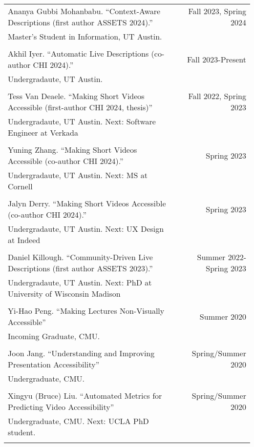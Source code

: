\begin{longtable}{Xr}
	Ananya Gubbi Mohanbabu. ``Context-Aware Descriptions (first author ASSETS 2024).'' & Fall 2023, Spring 2024 \\
	Master's Student in Information, UT Austin. &  \\
	\\

	Akhil Iyer. ``Automatic Live Descriptions (co-author CHI 2024).'' & Fall 2023-Present \\
	Undergradaute, UT Austin. &  \\
	\\

	Tess Van Deaele. ``Making Short Videos Accessible (first-author CHI 2024, thesis)'' & Fall 2022, Spring 2023 \\
	Undergradaute, UT Austin. Next: Software Engineer at Verkada &  \\
	\\

	Yuning Zhang. ``Making Short Videos Accessible (co-author CHI 2024).'' & Spring 2023 \\
	Undergradaute, UT Austin. Next: MS at Cornell &  \\
	\\

	Jalyn Derry. ``Making Short Videos Accessible (co-author CHI 2024).'' & Spring 2023 \\
	Undergradaute, UT Austin. Next: UX Design at Indeed &  \\
	\\

	Daniel Killough. ``Community-Driven Live Descriptions (first author ASSETS 2023).'' & Summer 2022-Spring 2023 \\
	Undergradaute, UT Austin. Next: PhD at University of Wisconsin Madison &  \\
	\\

	Yi-Hao Peng. ``Making Lectures Non-Visually Accessible'' & Summer 2020 \\
	Incoming Graduate, CMU. &  \\
	\\

	Joon Jang. ``Understanding and Improving Presentation Accessibility'' & Spring/Summer 2020 \\
	Undergraduate, CMU. &  \\
	\\

	Xingyu (Bruce) Liu. ``Automated Metrics for Predicting Video Accessibility'' & Spring/Summer 2020 \\
	Undergraduate, CMU. Next: UCLA PhD student. &  \\
	\\


\end{longtable}
